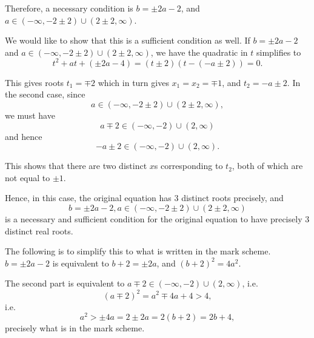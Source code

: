 \begin{enumerate}
          Therefore, a necessary condition is \(b = \pm 2a - 2\), and \(a \in \left(-\infty, -2 \pm 2\right) \cup \left(2 \pm 2, \infty\right)\).

          We would like to show that this is a sufficient condition as well. If \(b = \pm 2a - 2\) and \(a \in \left(-\infty, -2 \pm 2\right) \cup \left(2 \pm 2, \infty\right)\), we have the quadratic in \(t\) simplifies to
          \[
              t^2 + at + (\pm 2a - 4) = (t \pm 2) (t - (-a \pm 2)) = 0.
          \]

          This gives roots \(t_1 = \mp 2\) which in turn gives \(x_1 = x_2 = \mp 1\), and \(t_2 = -a \pm 2\). In the second case, since
          \[
              a \in \left(-\infty, -2 \pm 2\right) \cup \left(2 \pm 2, \infty\right),
          \]
          we must have
          \[
              a \mp 2 \in \left(-\infty, -2\right) \cup \left(2, \infty\right)
          \]
          and hence
          \[
              -a \pm 2 \in \left(-\infty, -2\right) \cup \left(2, \infty\right).
          \]

          This shows that there are two distinct \(x\)s corresponding to \(t_2\), both of which are not equal to \(\pm 1\).

          Hence, in this case, the original equation has \(3\) distinct roots precisely, and
          \[
              b = \pm 2a - 2, a \in \left(-\infty, -2 \pm 2\right) \cup \left(2 \pm 2, \infty\right)
          \]
          is a necessary and sufficient condition for the original equation to have precisely \(3\) distinct real roots.

          The following is to simplify this to what is written in the mark scheme. \(b = \pm 2a - 2\) is equivalent to \(b + 2 = \pm 2a\), and \((b + 2)^2 = 4a^2\).

          The second part is equivalent to \(a \mp 2 \in \left(-\infty, -2\right) \cup \left(2, \infty\right)\), i.e.
          \[
              (a \mp 2)^2  = a^2 \mp 4a + 4 > 4,
          \]
          i.e.
          \[
              a^2 > \pm 4a = 2 \pm 2a = 2 (b + 2) = 2b + 4,
          \]
          precisely what is in the mark scheme.
\end{enumerate}